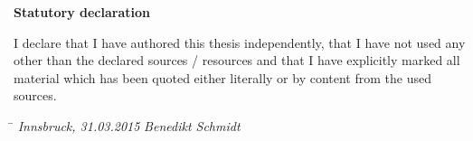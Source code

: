 \vspace{5cm}
\begin{center}
	\large
	\textbf{Statutory declaration}
\end{center}

I declare that I have authored this thesis independently, that I have not used any other than the declared sources / resources and that I have explicitly marked all material which has been quoted either literally or by content from the used sources.

\vspace{3cm}
\begin{tabbing}
	\hspace{6cm}  \= \kill
	\textit{Innsbruck, 31.03.2015} \> \textit{Benedikt Schmidt}
\end{tabbing}
